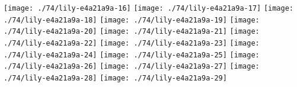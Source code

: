   \linebreak
\else
  \expandafter{}%
\fi
\texttt{[image: ./74/lily-e4a21a9a-16]}%
\ifx\betweenLilyPondSystem \undefined
  \linebreak
\else
  \expandafter{}%
\fi
\texttt{[image: ./74/lily-e4a21a9a-17]}%
\ifx\betweenLilyPondSystem \undefined
  \linebreak
\else
  \expandafter{}%
\fi
\texttt{[image: ./74/lily-e4a21a9a-18]}%
\ifx\betweenLilyPondSystem \undefined
  \linebreak
\else
  \expandafter{}%
\fi
\texttt{[image: ./74/lily-e4a21a9a-19]}%
\ifx\betweenLilyPondSystem \undefined
  \linebreak
\else
  \expandafter{}%
\fi
\texttt{[image: ./74/lily-e4a21a9a-20]}%
\ifx\betweenLilyPondSystem \undefined
  \linebreak
\else
  \expandafter{}%
\fi
\texttt{[image: ./74/lily-e4a21a9a-21]}%
\ifx\betweenLilyPondSystem \undefined
  \linebreak
\else
  \expandafter{}%
\fi
\texttt{[image: ./74/lily-e4a21a9a-22]}%
\ifx\betweenLilyPondSystem \undefined
  \linebreak
\else
  \expandafter{}%
\fi
\texttt{[image: ./74/lily-e4a21a9a-23]}%
\ifx\betweenLilyPondSystem \undefined
  \linebreak
\else
  \expandafter{}%
\fi
\texttt{[image: ./74/lily-e4a21a9a-24]}%
\ifx\betweenLilyPondSystem \undefined
  \linebreak
\else
  \expandafter{}%
\fi
\texttt{[image: ./74/lily-e4a21a9a-25]}%
\ifx\betweenLilyPondSystem \undefined
  \linebreak
\else
  \expandafter{}%
\fi
\texttt{[image: ./74/lily-e4a21a9a-26]}%
\ifx\betweenLilyPondSystem \undefined
  \linebreak
\else
  \expandafter{}%
\fi
\texttt{[image: ./74/lily-e4a21a9a-27]}%
\ifx\betweenLilyPondSystem \undefined
  \linebreak
\else
  \expandafter{}%
\fi
\texttt{[image: ./74/lily-e4a21a9a-28]}%
\ifx\betweenLilyPondSystem \undefined
  \linebreak
\else
  \expandafter{}%
\fi
\texttt{[image: ./74/lily-e4a21a9a-29]}%
\ifx\betweenLilyPondSystem \undefined
  \linebreak
